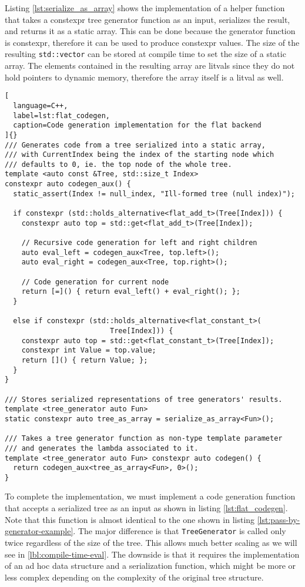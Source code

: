 \documentclass[../main]{subfiles}
\begin{document}
Listing \ref{lst:serialize_as_array} shows the implementation of a helper
function that takes a \gls{constexpr} tree generator function as an input,
serializes the result, and returns it as a static array.
This can be done because the generator function is \gls{constexpr}, therefore it
can be used to produce \gls{constexpr} values. The size of the resulting
\lstinline{std::vector} can be stored at compile time to set the size
of a static array.
The elements contained in the resulting array are \glspl{litval} since they do
not hold pointers to dynamic memory, therefore the array itself is a
\gls{litval} as well.

\begin{lstlisting}[
  language=C++,
  label=lst:flat_codegen,
  caption=Code generation implementation for the flat backend
]{}
/// Generates code from a tree serialized into a static array,
/// with CurrentIndex being the index of the starting node which
/// defaults to 0, ie. the top node of the whole tree.
template <auto const &Tree, std::size_t Index>
constexpr auto codegen_aux() {
  static_assert(Index != null_index, "Ill-formed tree (null index)");

  if constexpr (std::holds_alternative<flat_add_t>(Tree[Index])) {
    constexpr auto top = std::get<flat_add_t>(Tree[Index]);

    // Recursive code generation for left and right children
    auto eval_left = codegen_aux<Tree, top.left>();
    auto eval_right = codegen_aux<Tree, top.right>();

    // Code generation for current node
    return [=]() { return eval_left() + eval_right(); };
  }

  else if constexpr (std::holds_alternative<flat_constant_t>(
                         Tree[Index])) {
    constexpr auto top = std::get<flat_constant_t>(Tree[Index]);
    constexpr int Value = top.value;
    return []() { return Value; };
  }
}

/// Stores serialized representations of tree generators' results.
template <tree_generator auto Fun>
static constexpr auto tree_as_array = serialize_as_array<Fun>();

/// Takes a tree generator function as non-type template parameter
/// and generates the lambda associated to it.
template <tree_generator auto Fun> constexpr auto codegen() {
  return codegen_aux<tree_as_array<Fun>, 0>();
}
\end{lstlisting}

To complete the implementation, we must implement a code generation function
that accepts a serialized tree as an input as shown in listing
\ref{lst:flat_codegen}. Note that this function is almost identical to
the one shown in listing \ref{lst:pass-by-generator-example}.
The major difference is that \lstinline{TreeGenerator} is called only
twice regardless of the size of the tree. This allows much better scaling
as we will see in \ref{lbl:compile-time-eval}.
The downside is that it requires the implementation of an ad hoc data
structure and a serialization function, which might be more or less complex
depending on the complexity of the original tree structure.
\end{document}
